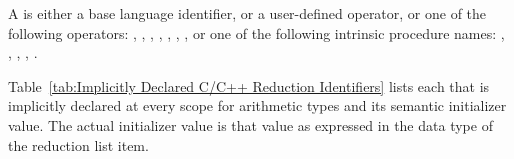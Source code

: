 \begin{fortranspecific}
A  is either a base language identifier, or a user-defined operator,
or one of the following operators:
\code{+},
\code{-},
\code{*},
,
,
,
,
 or one of the following intrinsic procedure names:
,
,
,
,
.
\end{fortranspecific}
%
%
\begin{ccppspecific} %
Table~\ref{tab:Implicitly Declared C/C++ Reduction Identifiers} lists each
 that is implicitly declared at every scope for
arithmetic types and its semantic initializer value. The actual initializer
value is that value as expressed in the data type of the reduction list item.



\end{ccppspecific}
